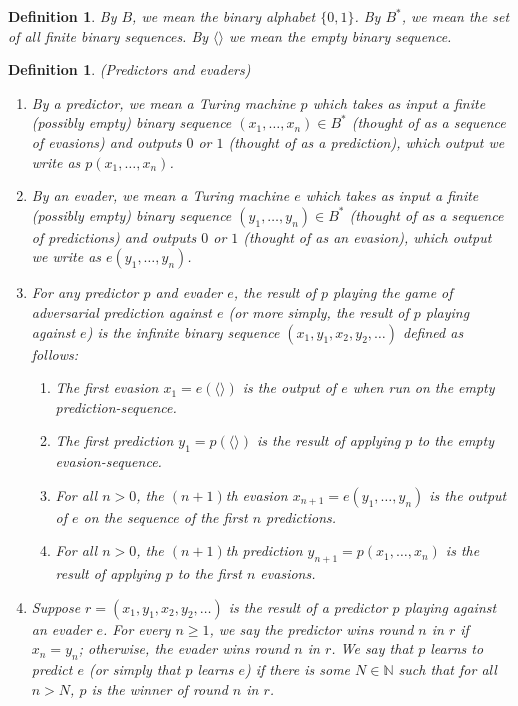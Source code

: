 \documentclass{article}
\newtheorem{definition}[theorem]{Definition}
\begin{document}
\begin{definition}
By $B$, we mean the binary alphabet $\{0,1\}$. By $B^*$, we mean the set of all
finite binary sequences. By $\langle\rangle$ we mean the empty binary sequence.
\end{definition}

\begin{definition}
\label{evaderpredictordefn}
    (Predictors and evaders)
    \begin{enumerate}
        \item
        By a \emph{predictor}, we mean a Turing machine $p$
        which takes as input a finite (possibly empty) binary sequence
        $(x_1,\ldots,x_n)\in B^*$
        (thought of as a sequence of \emph{evasions})
        and outputs $0$ or $1$ (thought of as a \emph{prediction}), which output
        we write as $p(x_1,\ldots,x_n)$.
        \item
        By an \emph{evader}, we mean a Turing machine $e$
        which takes as input a finite (possibly empty) binary sequence
        $(y_1,\ldots,y_n)\in B^*$
        (thought of as a sequence of \emph{predictions})
        and outputs $0$ or $1$ (thought of as an \emph{evasion}), which output
        we write as $e(y_1,\ldots,y_n)$.
        \item
        For any predictor $p$ and evader $e$, the \emph{result of $p$ playing the
        game of adversarial prediction against $e$} (or more simply, the \emph{result of
        $p$ playing against $e$}) is the infinite binary sequence
        $(x_1,y_1,x_2,y_2,\ldots)$
        defined as follows:
        \begin{enumerate}
            \item
            The first evasion
            $x_1=e(\langle\rangle)$ is
            the output of $e$ when run on the empty prediction-sequence.
            \item
            The first prediction
            $y_1=p(\langle\rangle)$ is
            the result of applying $p$ to the empty evasion-sequence.
            \item
            For all $n>0$, the $(n+1)$th evasion
            $x_{n+1}=e(y_1,\ldots,y_n)$ is
            the output of $e$ on the sequence of the first $n$ predictions.
            \item
            For all $n>0$, the $(n+1)$th prediction
            $y_{n+1}=p(x_1,\ldots,x_n)$ is
            the result of applying $p$ to the first $n$ evasions.
        \end{enumerate}
        \item
        Suppose $r=(x_1,y_1,x_2,y_2,\ldots)$ is the result of a predictor $p$ playing
        against an evader $e$. For every $n\geq 1$,
        we say \emph{the predictor wins round $n$ in $r$}
        if $x_n=y_n$; otherwise,
        \emph{the evader wins round $n$ in $r$}.
        We say that \emph{$p$ learns to predict $e$}
        (or simply that \emph{$p$ learns $e$}) if there is some $N\in\mathbb N$
        such that for all $n>N$, $p$ is the winner of round $n$ in $r$.
    \end{enumerate}
\end{definition}
\end{document}
